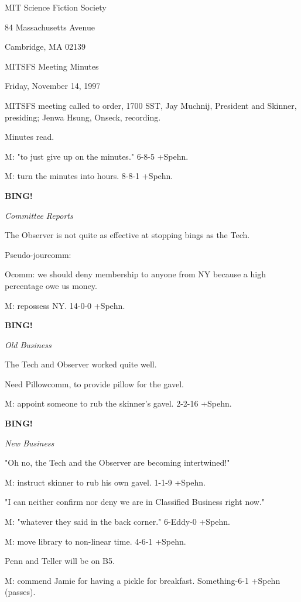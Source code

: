 \documentclass[12pt]{article}
\newcommand{\bing}{{\bf BING!} }
\newcommand{\goto}[1]{\bing \vskip 12pt \centerline{{\em{#1}}}}
\begin{document}
\begin{center}

MIT Science Fiction Society 

84 Massachusetts Avenue

Cambridge, MA 02139

\vspace{12pt}

MITSFS Meeting Minutes 

Friday, November 14, 1997

\end{center}
 
\vspace{18pt}

\setlength{\parskip}{6pt}

\noindent
MITSFS meeting called to order, 1700 SST,
Jay Muchnij, President and Skinner, presiding; Jenwa Hsung, Onseck, recording.

Minutes read.

M: "to just give up on the minutes." 6-8-5 +Spehn.

M: turn the minutes into hours. 8-8-1 +Spehn.

\goto{Committee Reports}

The Observer is not quite as effective at stopping bings as the Tech.

Pseudo-jourcomm:

Ocomm: we should deny membership to anyone from NY because a high percentage owe us money.

M: repossess NY. 14-0-0 +Spehn.

\goto{Old Business}

The Tech and Observer worked quite well.

Need Pillowcomm, to provide pillow for the gavel.

M: appoint someone to rub the skinner's gavel. 2-2-16 +Spehn.

\goto{New Business}

"Oh no, the Tech and the Observer are becoming intertwined!"

M: instruct skinner to rub his own gavel. 1-1-9 +Spehn.

"I can neither confirm nor deny we are in Classified Business right now."

M: "whatever they said in the back corner." 6-Eddy-0 +Spehn.

M: move library to non-linear time. 4-6-1 +Spehn.

Penn and Teller will be on B5.

M: commend Jamie for having a pickle for breakfast. Something-6-1 +Spehn (passes).
\end{document}

